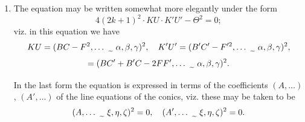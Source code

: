 \documentclass[12pt,a4paper]{article}
\theoremstyle{plain}
\theoremstyle{definition}
\theoremstyle{remark}
\begin{document}
\begin{enumerate}[label=\arabic*.]
We then have
\[(a-b)^2 = (a+b)^2 - 4ab = -4\gamma^2 K(\alpha,\beta,\gamma)^2,\]
and similarly
\[(c-d)^2 = -4\gamma^2 K'(\alpha,\beta,\gamma)^2.\]

We have, moreover,
\begin{align*}
&(a+b)(c+d) - 2(ab+cd) \\
&\quad = 4(H\gamma^2 - F\alpha\gamma - G\beta\gamma + C\alpha\beta)(H'\gamma^2 - F'\alpha\gamma - G'\beta\gamma + C'\alpha\beta) \\
&\qquad - 2(B\gamma^2 - 2F\beta\gamma + C\beta^2)(A'\gamma^2 - 2G'\gamma\alpha + C'\alpha^2) \\
&\qquad - 2(B'\gamma^2 - 2F'\beta\gamma + C'\beta^2)(A\gamma^2 - 2G\gamma\alpha + C\alpha^2) \\
&\quad = -2\gamma^2(BC' + B'C - 2FF', \ldots \,\raisebox{-0.5ex}{\,\texttildelow\,}\, \alpha,\beta,\gamma)^2,
\end{align*}
and substituting the foregoing values, we find
\[4(2k+1)^2 KK'(\alpha,\ldots \,\raisebox{-0.5ex}{\,\texttildelow\,}\, \alpha,\beta,\gamma)^2 - \{(BC' + B'C - 2FF', \ldots \,\raisebox{-0.5ex}{\,\texttildelow\,}\, \alpha,\beta,\gamma)^2\}^2 = 0,\]
or putting for shortness
\[\Theta = (BC' + B'C - 2FF', GH' + G'H - AF' - A'F, \ldots \,\raisebox{-0.5ex}{\,\texttildelow\,}\, \alpha,\beta,\gamma)^2,\]
the equation of the locus is
\[4(2k+1)^2 KK' \cdot UU' - \Theta^2 = 0,\]
where $(\alpha,\beta,\gamma)$ are current coordinates.

The locus is thus a quartic curve having quadruple contact with each of the conics $U = 0$, $U' = 0$; viz. it touches them at their points of intersection with the conic $\Theta = 0$, which is the locus of the point such that the four tangents form a harmonic pencil.

\item The equation may be written somewhat more elegantly under the form
\[4(2k+1)^2 \cdot KU \cdot K'U' - \Theta^2 = 0;\]
viz. in this equation we have
\[KU = (BC - F^2, \ldots \,\raisebox{-0.5ex}{\,\texttildelow\,}\, \alpha,\beta,\gamma)^2, \quad K'U' = (B'C' - F'^2, \ldots \,\raisebox{-0.5ex}{\,\texttildelow\,}\, \alpha,\beta,\gamma)^2,\]
\[= (BC' + B'C - 2FF', \ldots \,\raisebox{-0.5ex}{\,\texttildelow\,}\, \alpha,\beta,\gamma)^2.\]

In the last form the equation is expressed in terms of the coefficients $(A,\ldots)$, $(A',\ldots)$ of the line equations of the conics, viz. these may be taken to be
\[(A,\ldots \,\raisebox{-0.5ex}{\,\texttildelow\,}\, \xi,\eta,\zeta)^2 = 0, \quad (A',\ldots \,\raisebox{-0.5ex}{\,\texttildelow\,}\, \xi,\eta,\zeta)^2 = 0.\]


\end{enumerate}
\end{document}
